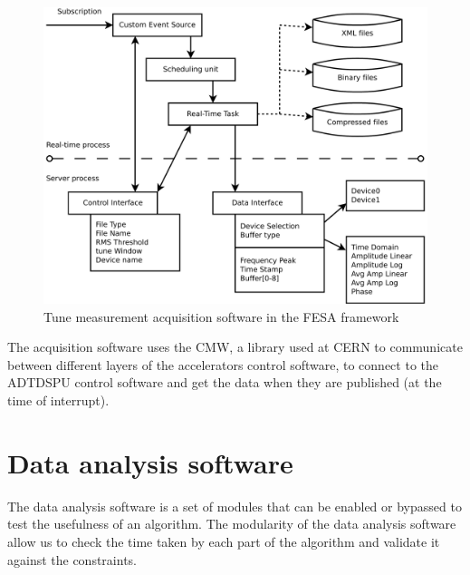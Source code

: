 \begin{figure}[H]
\caption{Tune measurement acquisition software in the FESA framework}
\centering
\includegraphics[scale=0.3]{tune_meas.pdf}
\end{figure}

The acquisition software uses the \gls{CMW}, a library used at \gls{CERN} to communicate between different layers of the accelerators control software, to connect to the \gls{ADTDSPU} control software and get the data when they are published (at the time of interrupt).

\section{Data analysis software}
\label{sec:data_analysis_software}

The data analysis software is a set of modules that can be enabled or bypassed to test the usefulness of an algorithm. The modularity of the data analysis software allow us to check the time taken by each part of the algorithm and validate it against the constraints.

